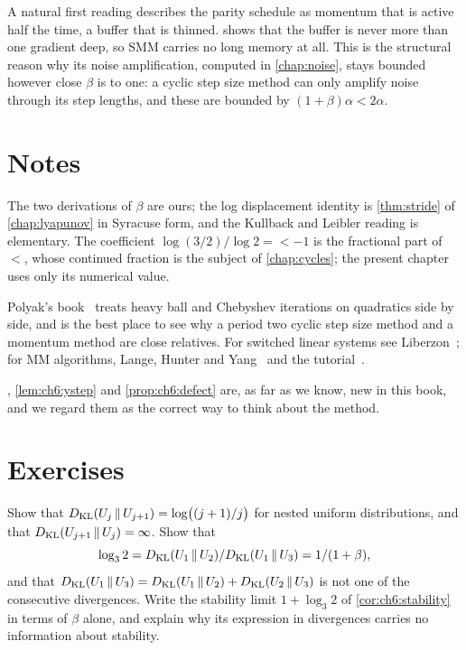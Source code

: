 \begin{remark}\label{rem:ch6:reframing}
A natural first reading describes the parity schedule as momentum that is
active half the time, a buffer that is thinned.  shows that
the buffer is never more than one gradient deep, so SMM carries no long memory
at all. This is the structural reason why its noise amplification, computed in
\cref{chap:noise}, stays bounded however close $\beta$ is to one: a cyclic step
size method can only amplify noise through its step lengths, and these are
bounded by $(1+\beta)\alpha<2\alpha$.
\end{remark}

\section*{Notes}

The two derivations of $\beta$ are ours; the log displacement identity is \cref{thm:stride} of
\cref{chap:lyapunov} in Syracuse form, and the Kullback and Leibler reading is
elementary. The coefficient $\log(3/2)/\log 2=\lt-1$ is the fractional part of
$\lt$, whose continued fraction is the subject of \cref{chap:cycles}; the
present chapter uses only its numerical value.

Polyak's book~\cite{polyak1987} treats heavy ball and Chebyshev iterations on
quadratics side by side, and is the best place to see why a period two cyclic
step size method and a momentum method are close relatives.
For switched linear systems see
Liberzon~\cite{liberzon2003}; for MM algorithms, Lange, Hunter and
Yang~\cite{lange2000} and the tutorial~\cite{hunter2004}.

, \cref{lem:ch6:ystep} and \cref{prop:ch6:defect} are, as far as we know, new in this book, and we regard them as the correct way to think about the method.

\section*{Exercises}

\begin{exercise}
Show that $D_{\mathrm{KL}}(U_j\,\|\,U_{j+1})=\log\bigl((j+1)/j\bigr)$ for nested uniform distributions, and that $D_{\mathrm{KL}}(U_{j+1}\,\|\,U_j)=\infty$. Show that \[ \log_3 2=D_{\mathrm{KL}}(U_1\,\|\,U_2)/D_{\mathrm{KL}}(U_1\,\|\,U_3)=1/(1+\beta), \] and that $D_{\mathrm{KL}}(U_1\,\|\,U_3)=D_{\mathrm{KL}}(U_1\,\|\,U_2)+D_{\mathrm{KL}}(U_2\,\|\,U_3)$ is not one of the consecutive divergences. Write the stability limit $1+\log_3 2$ of \cref{cor:ch6:stability} in terms of $\beta$ alone, and explain why its expression in divergences carries no information about stability.
\end{exercise}

